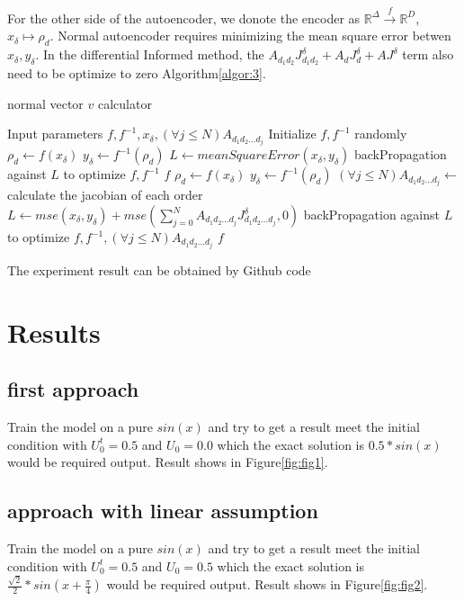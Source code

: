 \documentclass{article}
\begin{document}
For the other side of the autoencoder, we donote
the encoder as $\mathbb{R}^{\Delta} \xrightarrow{f} \mathbb{R}^{D}$,
$x_\delta \mapsto {\rho}_d$. Normal autoencoder
requires minimizing the mean square error betwen
$x_\delta, y_\delta$. In the differential Informed
method, the
$A_{d_1 d_2}J^\delta_{d_1 d_2}+A_{d}J^\delta_d+AJ^\delta$
term also need to be optimize to zero Algorithm\ref{algor:3}.
\begin{algorithm}
    \caption{normal vector $v$ calculator}\label{algor:3}
    \begin{algorithmic}[1]
        \REQUIRE Input parameters $f, f^{-1}, x_\delta ,(\forall j\leq N)A_{d_1 d_2 ... d_j}$
        \STATE Initialize $f, f^{-1}$ randomly
        \REPEAT
        \STATE $\rho_d \leftarrow f(x_\delta)$
        \STATE $y_\delta \leftarrow f^{-1}(\rho_d)$
        \STATE $L \leftarrow meanSquareError(x_\delta,y_\delta)$
        \STATE backPropagation against $L$ to optimize $f, f^{-1}$
        \RETURN $f$
        \REPEAT
        \STATE $\rho_d \leftarrow f(x_\delta)$
        \STATE $y_\delta \leftarrow f^{-1}(\rho_d)$
        \STATE $(\forall j\leq N)A_{d_1 d_2 ... d_j} \leftarrow$ calculate the jacobian of each order
        \STATE $L \leftarrow mse(x_\delta,y_\delta)+mse(\sum_{j=0}^{N} A_{d_1 d_2 ... d_j}J^\delta_{d_1 d_2 ... d_j},0)$
        \STATE backPropagation against $L$ to optimize $f, f^{-1},(\forall j\leq N)A_{d_1 d_2 ... d_j}$
        \RETURN $f$
    \end{algorithmic}
\end{algorithm}

The experiment result can be obtained by Github
code \cite[deLinearAugSine]{deLinearAugSine}

\section{Results}
\subsection{first approach}
Train the model on a pure $sin(x)$ and try to
get a result meet the initial condition with
$U^{t}_0=0.5$ and $U_0=0.0$ which the exact solution is $0.5*sin(x)$ would be
required output. Result shows in Figure\ref{fig:fig1}.
\subsection{approach with linear assumption}
Train the model on a pure $sin(x)$ and try to
get a result meet the initial condition with
$U^{t}_0=0.5$ and $U_0=0.5$ which the exact solution is $\frac{\sqrt{2}}{2}*sin(x+\frac{\pi}{4})$ would be
required output. Result shows in Figure\ref{fig:fig2}.
\end{document}
